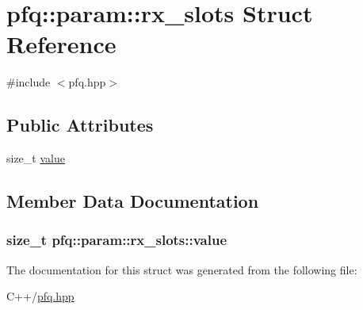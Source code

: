 \hypertarget{structpfq_1_1param_1_1rx__slots}{\section{pfq\+:\+:param\+:\+:rx\+\_\+slots Struct Reference}
\label{structpfq_1_1param_1_1rx__slots}
}


{\ttfamily \#include $<$pfq.\+hpp$>$}

\subsection*{Public Attributes}
\begin{DoxyCompactItemize}
\item 
size\+\_\+t \hyperlink{structpfq_1_1param_1_1rx__slots_a2bafbed5d322cf89df33ca10bc397822}{value}
\end{DoxyCompactItemize}


\subsection{Member Data Documentation}
\hypertarget{structpfq_1_1param_1_1rx__slots_a2bafbed5d322cf89df33ca10bc397822}{
\subsubsection[{value}]{\setlength{\rightskip}{0pt plus 5cm}size\+\_\+t pfq\+::param\+::rx\+\_\+slots\+::value}}\label{structpfq_1_1param_1_1rx__slots_a2bafbed5d322cf89df33ca10bc397822}


The documentation for this struct was generated from the following file\+:\begin{DoxyCompactItemize}
\item 
C++/\hyperlink{pfq_8hpp}{pfq.\+hpp}\end{DoxyCompactItemize}
